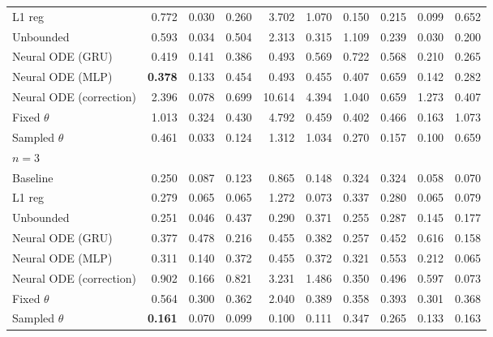 \begin{tabular}{lrrrrrrrrr}
L1 reg & 0.772 & 0.030 & 0.260 & 3.702 & 1.070 & 0.150 & 0.215 & 0.099 & 0.652 \\
Unbounded & 0.593 & 0.034 & 0.504 & 2.313 & 0.315 & 1.109 & 0.239 & 0.030 & 0.200 \\
Neural ODE (GRU) & 0.419 & 0.141 & 0.386 & 0.493 & 0.569 & 0.722 & 0.568 & 0.210 & 0.265 \\
Neural ODE (MLP) & \textbf{0.378} & 0.133 & 0.454 & 0.493 & 0.455 & 0.407 & 0.659 & 0.142 & 0.282 \\
Neural ODE (correction) & 2.396 & 0.078 & 0.699 & 10.614 & 4.394 & 1.040 & 0.659 & 1.273 & 0.407 \\
Fixed $\theta$ & 1.013 & 0.324 & 0.430 & 4.792 & 0.459 & 0.402 & 0.466 & 0.163 & 1.073 \\
Sampled $\theta$ & 0.461 & 0.033 & 0.124 & 1.312 & 1.034 & 0.270 & 0.157 & 0.100 & 0.659 \\
\midrule
\multicolumn{10}{l}{\textbf{$n=3$}} \\
Baseline & 0.250 & 0.087 & 0.123 & 0.865 & 0.148 & 0.324 & 0.324 & 0.058 & 0.070 \\
L1 reg & 0.279 & 0.065 & 0.065 & 1.272 & 0.073 & 0.337 & 0.280 & 0.065 & 0.079 \\
Unbounded & 0.251 & 0.046 & 0.437 & 0.290 & 0.371 & 0.255 & 0.287 & 0.145 & 0.177 \\
Neural ODE (GRU) & 0.377 & 0.478 & 0.216 & 0.455 & 0.382 & 0.257 & 0.452 & 0.616 & 0.158 \\
Neural ODE (MLP) & 0.311 & 0.140 & 0.372 & 0.455 & 0.372 & 0.321 & 0.553 & 0.212 & 0.065 \\
Neural ODE (correction) & 0.902 & 0.166 & 0.821 & 3.231 & 1.486 & 0.350 & 0.496 & 0.597 & 0.073 \\
Fixed $\theta$ & 0.564 & 0.300 & 0.362 & 2.040 & 0.389 & 0.358 & 0.393 & 0.301 & 0.368 \\
Sampled $\theta$ & \textbf{0.161} & 0.070 & 0.099 & 0.100 & 0.111 & 0.347 & 0.265 & 0.133 & 0.163 \\
\bottomrule
\end{tabular}
